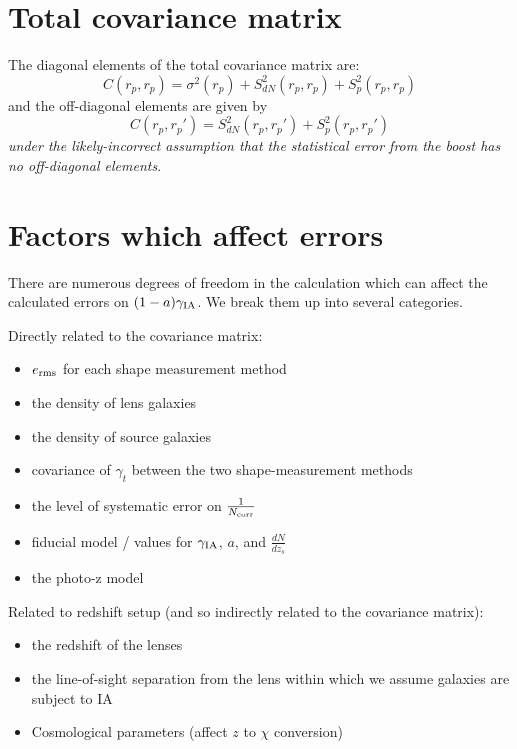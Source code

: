 \documentclass[onecolumn,amsmath,aps,fleqn, superscriptaddress]{revtex4}
\begin{document}
\section*{Total covariance matrix}

The diagonal elements of the total covariance matrix are:
\begin{equation}
C(r_p,r_p) = \sigma^2(r_p) + S_{dN}^2(r_p, r_p) + S_{p}^2(r_p, r_p)
\label{diag}
\end{equation}
and the off-diagonal elements are given by
\begin{equation}
C(r_p, r_p') = S_{dN}^2(r_p,r_p')+S_{p}^2(r_p,r_p')
\label{off_diag}
\end{equation}
{\it under the likely-incorrect assumption that the statistical error from the boost has no off-diagonal elements}.

\section*{Factors which affect errors}
There are numerous degrees of freedom in the calculation which can affect the calculated errors on $(1-a)\gamma_{\rm IA}$. We break them up into several categories.

Directly related to the covariance matrix:
\begin{itemize}
\item{$e_{\rm rms}$ for each shape measurement method}
\item{the density of lens galaxies}
\item{the density of source galaxies}
\item{covariance of $\gamma_t$ between the two shape-measurement methods}
\item{the level of systematic error on $\frac{1}{N_{\rm corr}}$}
\item{fiducial model / values for $\gamma_{\rm IA}$, $a$, and $\frac{dN}{dz_s}$}
\item{the photo-z model}
\end{itemize}

Related to redshift setup (and so indirectly related to the covariance matrix):
\begin{itemize}
\item{the redshift of the lenses}
\item{the line-of-sight separation from the lens within which we assume galaxies are subject to IA}
\item{Cosmological parameters (affect $z$ to $\chi$ conversion)}
\end{itemize}
\end{document}

